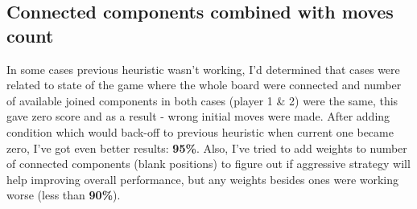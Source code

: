 \documentclass[11pt]{article}
\begin{document}
\subsection{Connected components combined with moves count}
In some cases previous heuristic wasn't working, I'd determined that cases were related to state of the game where the whole board were connected and number of available joined components in both cases (player 1 \& 2) were the same, this gave zero score and as a result - wrong initial moves were made. After adding condition which would back-off to previous heuristic when current one became zero, I've got even better results: \textbf{95\%}. Also, I've tried to add weights to number of connected components (blank positions) to figure out if aggressive strategy will help improving overall performance, but any weights besides ones were working worse (less than \textbf{90\%}).
\end{document}

